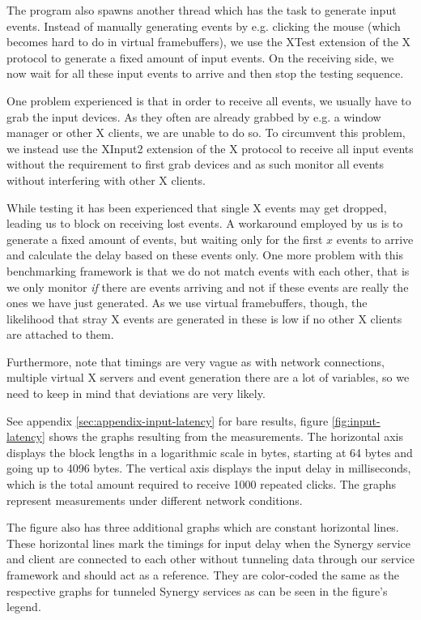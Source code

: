 The program also spawns another thread which has the task to generate input events.
Instead of manually generating events by e.g. clicking the mouse (which becomes hard to do in virtual framebuffers), we use the XTest extension of the X protocol to generate a fixed amount of input events.
On the receiving side, we now wait for all these input events to arrive and then stop the testing sequence.

One problem experienced is that in order to receive all events, we usually have to grab the input devices.
As they often are already grabbed by e.g. a window manager or other X clients, we are unable to do so.
To circumvent this problem, we instead use the XInput2 extension of the X protocol to receive all input events without the requirement to first grab devices and as such monitor all events without interfering with other X clients.

While testing it has been experienced that single X events may get dropped, leading us to block on receiving lost events.
A workaround employed by us is to generate a fixed amount of events, but waiting only for the first $x$ events to arrive and calculate the delay based on these events only.
One more problem with this benchmarking framework is that we do not match events with each other, that is we only monitor \emph{if} there are events arriving and not if these events are really the ones we have just generated.
As we use virtual framebuffers, though, the likelihood that stray X events are generated in these is low if no other X clients are attached to them.

Furthermore, note that timings are very vague as with network connections, multiple virtual X servers and event generation there are a lot of variables, so we need to keep in mind that deviations are very likely.

See appendix \ref{sec:appendix-input-latency} for bare results, figure \ref{fig:input-latency} shows the graphs resulting from the measurements.
The horizontal axis displays the block lengths in a logarithmic scale in bytes, starting at 64 bytes and going up to 4096 bytes.
The vertical axis displays the input delay in milliseconds, which is the total amount required to receive 1000 repeated clicks.
The graphs represent measurements under different network conditions.

The figure also has three additional graphs which are constant horizontal lines.
These horizontal lines mark the timings for input delay when the Synergy service and client are connected to each other without tunneling data through our service framework and should act as a reference.
They are color-coded the same as the respective graphs for tunneled Synergy services as can be seen in the figure's legend.

